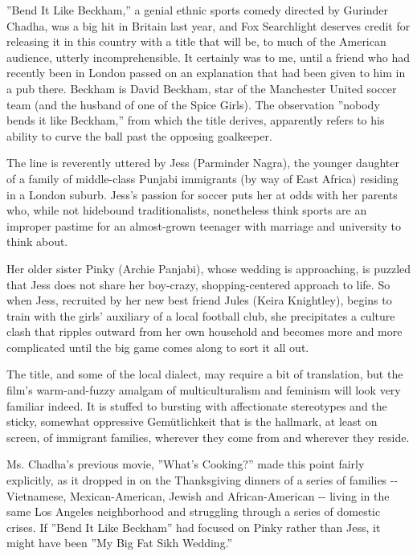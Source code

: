 ''Bend It Like Beckham,'' a genial ethnic sports comedy directed by
Gurinder Chadha, was a big hit in Britain last year, and Fox Searchlight
deserves credit for releasing it in this country with a title that will
be, to much of the American audience, utterly incomprehensible. It
certainly was to me, until a friend who had recently been in London
passed on an explanation that had been given to him in a pub there.
Beckham is David Beckham, star of the Manchester United soccer team (and
the husband of one of the Spice Girls). The observation ''nobody bends
it like Beckham,'' from which the title derives, apparently refers to
his ability to curve the ball past the opposing goalkeeper.

The line is reverently uttered by Jess (Parminder Nagra), the younger
daughter of a family of middle-class Punjabi immigrants (by way of East
Africa) residing in a London suburb. Jess's passion for soccer puts her
at odds with her parents who, while not hidebound traditionalists,
nonetheless think sports are an improper pastime for an almost-grown
teenager with marriage and university to think about.

Her older sister Pinky (Archie Panjabi), whose wedding is approaching,
is puzzled that Jess does not share her boy-crazy, shopping-centered
approach to life. So when Jess, recruited by her new best friend Jules
(Keira Knightley), begins to train with the girls' auxiliary of a local
football club, she precipitates a culture clash that ripples outward
from her own household and becomes more and more complicated until the
big game comes along to sort it all out.

The title, and some of the local dialect, may require a bit of
translation, but the film's warm-and-fuzzy amalgam of multiculturalism
and feminism will look very familiar indeed. It is stuffed to bursting
with affectionate stereotypes and the sticky, somewhat oppressive
Gemütlichkeit that is the hallmark, at least on screen, of immigrant
families, wherever they come from and wherever they reside.

Ms. Chadha's previous movie, ''What's Cooking?'' made this point fairly
explicitly, as it dropped in on the Thanksgiving dinners of a series of
families -\/- Vietnamese, Mexican-American, Jewish and African-American
-\/- living in the same Los Angeles neighborhood and struggling through
a series of domestic crises. If ''Bend It Like Beckham'' had focused on
Pinky rather than Jess, it might have been ''My Big Fat Sikh Wedding.''

